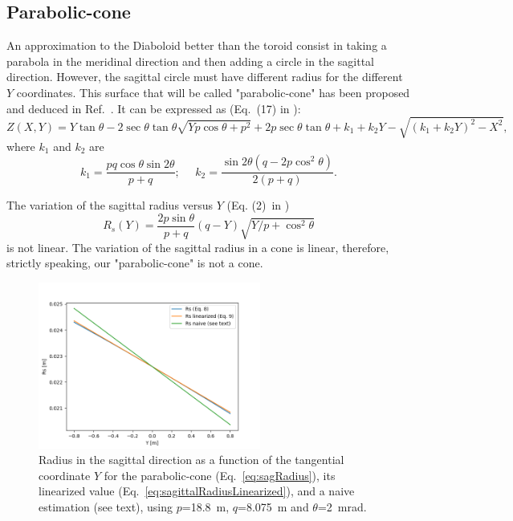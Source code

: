 \documentclass{iucr}              %
\begin{document}
\subsection{Parabolic-cone}
An approximation to the Diaboloid better than the toroid consist in taking a parabola in the meridinal direction and then adding a circle in the sagittal direction. However, the sagittal circle must have different radius for the different $Y$ coordinates. This surface that will be called "parabolic-cone" has been proposed and deduced in Ref.~\cite{Valeriy2020c}. It can be expressed as (Eq.~(17) in \cite{Valeriy2020c}):
\begin{equation}
\label{eqn:parabolicCone}
Z(X,Y) = Y \tan\theta - 2 \sec\theta \tan\theta
\sqrt{Y p \cos\theta + p^2} + 2 p \sec\theta \tan\theta +
k_1 + k_2 Y - \sqrt{(k_1 + k_2 Y)^2 - X^2},
\end{equation}
where $k_1$ and $k_2$ are
\begin{equation}
k_1 = \frac{p q \cos\theta \sin2\theta}{p+q};~~~~~~
k_2 = \frac{\sin2\theta(q-2p\cos^2\theta)}{2(p+q)}.
\end{equation}

The variation of the sagittal radius versus $Y$  (Eq. (2)\ in \cite{Valeriy2020c})
\begin{equation}
\label{eq:sagRadius}
R_s(Y) = \frac{2  p \sin\theta}{p + q} (q - Y)   \sqrt{Y / p + \cos^2\theta}
\end{equation}
is not linear. The variation of the sagittal radius in a cone is linear, therefore, strictly speaking, our "parabolic-cone" is not a cone. 

\begin{figure}[h]
\centering
\includegraphics[width=0.65\textwidth]{figures/sagittalradius.png}
\caption{\label{fig:sagittalRadius}Radius in the sagittal direction as a function of the tangential coordinate $Y$ for the parabolic-cone (Eq.~\ref{eq:sagRadius}), its linearized value (Eq.~\ref{eq:sagittalRadiusLinearized}), and a naive estimation (see text), using $p$=18.8~m, $q$=8.075~m and $\theta$=2~mrad.
}
\end{figure}
\end{document}
